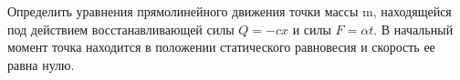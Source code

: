 Определить уравнения прямолинейного движения точки массы m, находящейся
под действием восстанавливающей силы $Q=-cx$ и силы $F=\alpha t$. В начальный
момент точка находится в положении статического равновесия и скорость ее
равна нулю.

